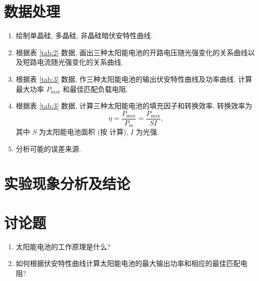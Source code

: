 \documentclass[signature=data]{physicsreport}
\begin{document}
\makeatletter
{}
\makeatother

\newpage
\section{数据处理}
\begin{enumerate}
    \item 绘制单晶硅, 多晶硅, 非晶硅暗伏安特性曲线.
    \item 根据表 \ref{tab:2} 数据, 画出三种太阳能电池的开路电压随光强变化的关系曲线以及短路电流随光强变化的关系曲线.
    \item 根据表 \ref{tab:3} 数据, 作三种太阳能电池的输出伏安特性曲线及功率曲线. 计算最大功率 $P_{\mathrm{max}}$ 和最佳匹配负载电阻.
    \item 根据表 \ref{tab:3} 数据, 计算三种太阳能电池的填充因子和转换效率. 转换效率为
          \begin{equation*}
              \eta=\frac{P_\mathrm{max}}{P_\mathrm{in}}=\frac{P_\mathrm{max}}{SI},
          \end{equation*}
          其中 $S$ 为太阳能电池面积 (按  计算), $I$ 为光强.
    \item 分析可能的误差来源.
\end{enumerate}

\newpage
\section{实验现象分析及结论}

\vspace*{25em}
\section{讨论题}
\begin{enumerate}
    \item 太阳能电池的工作原理是什么?
    \item 如何根据伏安特性曲线计算太阳能电池的最大输出功率和相应的最佳匹配电阻?
\end{enumerate}
\end{document}
